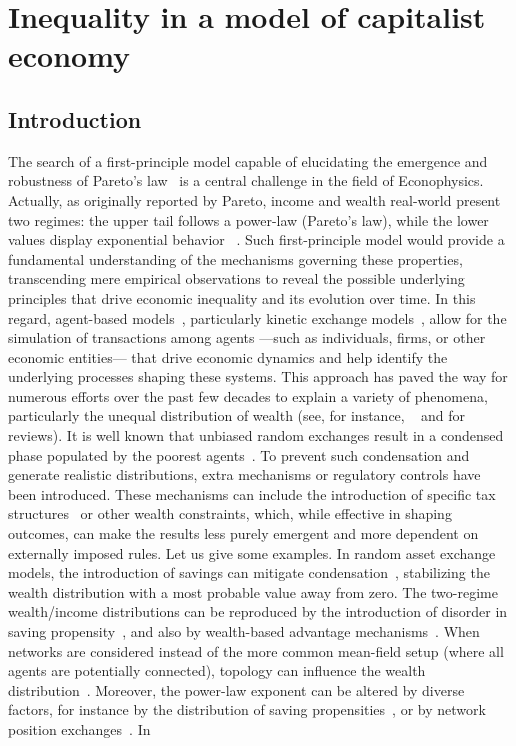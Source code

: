 %

\section{Inequality in a model of capitalist economy}

\subsection{Introduction}

\label{sec:introduction}

The search of a first-principle model capable of elucidating the emergence and robustness of Pareto's law~\cite{paretonovo} is a central challenge in the field of Econophysics. Actually, as originally reported by Pareto, income and wealth real-world present two regimes: the upper tail follows a power-law (Pareto's law), while the lower values display exponential behavior ~\cite{dragulescu2001,yakovenko2023}. Such first-principle model would provide a fundamental understanding of the mechanisms governing these properties, transcending mere empirical observations to reveal the possible underlying principles that drive economic inequality and its evolution over time. In this regard, agent-based models~\cite{chakraborti2011}, particularly kinetic exchange models~\cite{metzler2023}, allow for the simulation of transactions among agents ---such as individuals, firms, or other economic entities--- that drive economic dynamics and help identify the underlying processes shaping these systems. This approach has paved the way for numerous efforts over the past few decades to explain a variety of phenomena, particularly the unequal distribution of wealth (see, for instance, ~\cite{boghosian2014a,metzler2019,chakraborti2000,dragulescu2000,bouchaud2000} and \cite{yakovenko2009,chakraborti2011,chakrabarti2013} for reviews). It is well known that unbiased random exchanges result in a condensed phase populated by the poorest agents~\cite{boghosian2014a,Cardoso2023}. To prevent such condensation and generate realistic distributions, extra mechanisms or regulatory controls have been introduced. These mechanisms can include the introduction of specific tax structures~\cite{LIMA2022,Calvelli2023,Dias2024} or other wealth constraints, which, while effective in shaping outcomes, can make the results less purely emergent and more dependent on externally imposed rules. Let us give some examples. In random asset exchange models, the introduction of savings can mitigate condensation~\cite{chakraborti2000}, stabilizing the wealth distribution with a most probable value away from zero. The two-regime wealth/income distributions can be reproduced by the introduction of disorder in saving propensity~\cite{Chatterjee2004}, and also by wealth-based advantage mechanisms~\cite{Calvelli2023,Vallejos2018}. When networks are considered instead of the more common mean-field setup (where all agents are potentially connected), topology can influence the wealth distribution~\cite{KOHLRAUSCH2024}. Moreover, the power-law exponent can be altered by diverse factors, for instance by the distribution of saving propensities~\cite{AYDINER2018}, or by network position exchanges~\cite{metzler2019}. In 